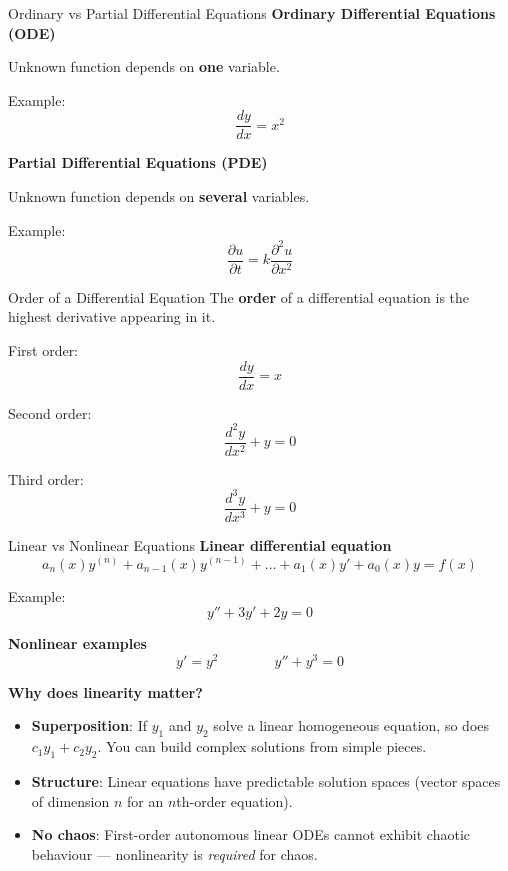 
\begin{frame}{Ordinary vs Partial Differential Equations}
\textbf{Ordinary Differential Equations (ODE)}

Unknown function depends on \textbf{one} variable.

Example:
\[
\frac{dy}{dx} = x^2
\]

\textbf{Partial Differential Equations (PDE)}

Unknown function depends on \textbf{several} variables.

Example:
\[
\frac{\partial u}{\partial t} = k \frac{\partial^2 u}{\partial x^2}
\]
\end{frame}

\begin{frame}{Order of a Differential Equation}
The \textbf{order} of a differential equation is the highest derivative appearing in it.

First order:
\[
\frac{dy}{dx} = x
\]

Second order:
\[
\frac{d^2y}{dx^2} + y = 0
\]

Third order:
\[
\frac{d^3y}{dx^3} + y = 0
\]
\end{frame}

\begin{frame}{Linear vs Nonlinear Equations}
\textbf{Linear differential equation}
\[
a_n(x)y^{(n)} + a_{n-1}(x)y^{(n-1)} + \dots + a_1(x)y' + a_0(x)y = f(x)
\]

Example:
\[
y'' + 3y' + 2y = 0
\]

\textbf{Nonlinear examples}
\[
y' = y^2 \qquad\qquad y'' + y^3 = 0
\]

\vspace{0.3cm}
\textbf{Why does linearity matter?}
\begin{itemize}
    \item \textbf{Superposition}: If $y_1$ and $y_2$ solve a linear homogeneous equation, so does $c_1 y_1 + c_2 y_2$. You can build complex solutions from simple pieces.
    \item \textbf{Structure}: Linear equations have predictable solution spaces (vector spaces of dimension $n$ for an $n$th-order equation).
    \item \textbf{No chaos}: First-order autonomous linear ODEs cannot exhibit chaotic behaviour --- nonlinearity is \emph{required} for chaos.
\end{itemize}
\end{frame}

